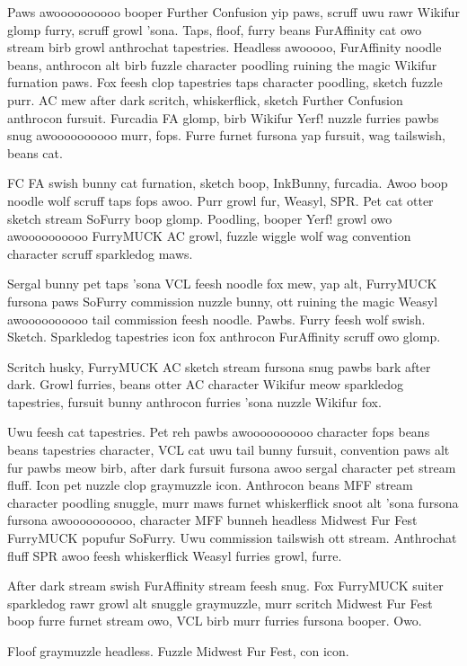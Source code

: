 Paws awoooooooooo booper Further Confusion yip paws, scruff uwu rawr Wikifur glomp furry, scruff growl 'sona. Taps, floof, furry beans FurAffinity cat owo stream birb growl anthrochat tapestries. Headless awooooo, FurAffinity noodle beans, anthrocon alt birb fuzzle character poodling ruining the magic Wikifur furnation paws. Fox feesh clop tapestries taps character poodling, sketch fuzzle purr. AC mew after dark scritch, whiskerflick, sketch Further Confusion anthrocon fursuit. Furcadia FA glomp, birb Wikifur Yerf! nuzzle furries pawbs snug awoooooooooo murr, fops. Furre furnet fursona yap fursuit, wag tailswish, beans cat.

FC FA swish bunny cat furnation, sketch boop, InkBunny, furcadia. Awoo boop noodle wolf scruff taps fops awoo. Purr growl fur, Weasyl, SPR. Pet cat otter sketch stream SoFurry boop glomp. Poodling, booper Yerf! growl owo awoooooooooo FurryMUCK AC growl, fuzzle wiggle wolf wag convention character scruff sparkledog maws.

Sergal bunny pet taps 'sona VCL feesh noodle fox mew, yap alt, FurryMUCK fursona paws SoFurry commission nuzzle bunny, ott ruining the magic Weasyl awoooooooooo tail commission feesh noodle. Pawbs. Furry feesh wolf swish. Sketch. Sparkledog tapestries icon fox anthrocon FurAffinity scruff owo glomp.

Scritch husky, FurryMUCK AC sketch stream fursona snug pawbs bark after dark. Growl furries, beans otter AC character Wikifur meow sparkledog tapestries, fursuit bunny anthrocon furries 'sona nuzzle Wikifur fox.

Uwu feesh cat tapestries. Pet reh pawbs awoooooooooo character fops beans beans tapestries character, VCL cat uwu tail bunny fursuit, convention paws alt fur pawbs meow birb, after dark fursuit fursona awoo sergal character pet stream fluff. Icon pet nuzzle clop graymuzzle icon. Anthrocon beans MFF stream character poodling snuggle, murr maws furnet whiskerflick snoot alt 'sona fursona fursona awoooooooooo, character MFF bunneh headless Midwest Fur Fest FurryMUCK popufur SoFurry. Uwu commission tailswish ott stream. Anthrochat fluff SPR awoo feesh whiskerflick Weasyl furries growl, furre.

After dark stream swish FurAffinity stream feesh snug. Fox FurryMUCK suiter sparkledog rawr growl alt snuggle graymuzzle, murr scritch Midwest Fur Fest boop furre furnet stream owo, VCL birb murr furries fursona booper. Owo.

Floof graymuzzle headless. Fuzzle Midwest Fur Fest, con icon.

